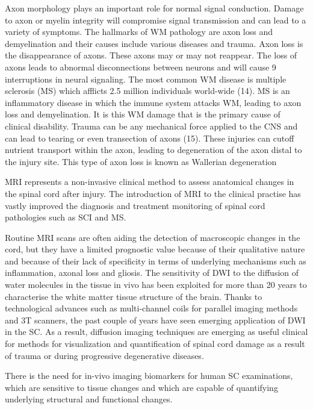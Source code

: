 Axon morphology plays an important role for normal signal conduction. Damage to axon or myelin integrity will compromise signal transmission and can lead to a variety of symptoms. The hallmarks of WM pathology are axon loss and demyelination and their causes include various diseases and trauma. Axon loss is the disappearance of axons. These axons may or may not reappear. The loss of axons leads to abnormal disconnections between neurons and will cause 9 interruptions in neural signaling. The most common WM disease is multiple sclerosis (MS) which afflicts 2.5 million individuals world-wide (14). MS is an inflammatory disease in which the immune system attacks WM, leading to axon loss and demyelination. It is this WM damage that is the primary cause of clinical disability. Trauma can be any mechanical force applied to the CNS and can lead to tearing or even transection of axons (15). These injuries can cutoff nutrient transport within the axon, leading to degeneration of the axon distal to the injury site. This type of axon loss is known as Wallerian degeneration

\Gls{MRI} represents a non-invasive clinical method to assess anatomical changes in the spinal cord after injury. The introduction of \gls{MRI} to the clinical practise has vastly improved the diagnosis and treatment monitoring of spinal cord pathologies such as \gls{SCI} and \gls{MS}. 

Routine \gls{MRI} scans are often aiding the detection of macroscopic changes in the cord, but they have a limited prognostic value because of their qualitative nature and because of their lack of specificity in terms of underlying mechanisms such as inflammation, axonal loss and gliosis. The sensitivity of {\gls{DWI}} to the diffusion of water molecules in the tissue in vivo has been exploited for more than 20 years to characterise the white matter tissue structure of the brain. Thanks to technological advances such as multi-channel coils for parallel imaging methods and 3T scanners, the past couple of years have seen emerging application of \gls{DWI} in the {\gls{SC}}. As a result, diffusion imaging techniques are emerging as useful clinical for methods for visualization and quantification of spinal cord damage as a result of trauma or during progressive degenerative diseases. 

There is the need for in-vivo imaging biomarkers for human {\gls{SC}} examinations, which are sensitive to tissue changes and which are capable of quantifying underlying structural and functional changes.


